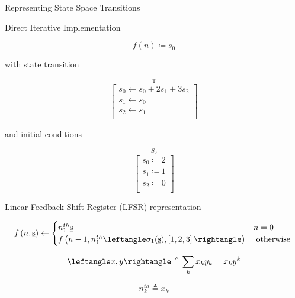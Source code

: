Representing State Space Transitions
\newline

Direct Iterative Implementation
\newline

\begin{equation}
f\left(n\right) \coloneqq s_0
\label{eq:direct_def}
\end{equation}

with state transition

\begin{equation}
\stackrel{\mbox{T}}{
\left[ \begin{array}{c}
s_0 \leftarrow s_0 + 2 s_1 + 3 s_2 \\
s_1 \leftarrow s_0 \\
s_2 \leftarrow s_1 \\
\end{array} \right]
}
\label{eq:direct_trans}
\end{equation}

and initial conditions

\begin{equation}
\stackrel{\mbox{$S_0$}}{
\left[ \begin{array}{c}
s_0 \coloneqq 2 \\
s_1 \coloneqq 1 \\
s_2 \coloneqq 0 \\
\end{array} \right]
}
\label{eq:direct_init}
\end{equation}

Linear Feedback Shift Register (LFSR) representation
\newline

\begin{equation}
f\left(n,\underbar{s}\right)
\leftarrow
\begin{cases}
n^{th}_1 \underbar{s} & n = 0 \\
f\left( n-1, n^{th}_1 \leftangle \sigma_{1}(\underbar{s}), \left[ 1,2,3 \right] \rightangle \right) & \mbox{ otherwise }
\end{cases}
\label{eq:lfsr_def}
\end{equation}

\begin{equation}
\leftangle x, y \rightangle
\triangleq
\sum_{k} x_k y_k 
= x_k y^k
\label{eq:dotprod}
\end{equation}

\begin{equation}
n^{th}_k
\triangleq
x_k
\label{eq:nth}
\end{equation}

